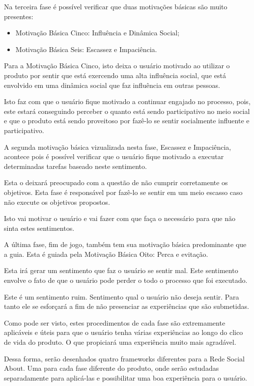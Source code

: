 Na terceira fase é possível verificar que duas motivações básicas são muito presentes:

\begin{itemize}
    \item Motivação Básica Cinco: Influência e Dinâmica Social;
    \item Motivação Básica Seis: Escassez e Impaciência.
\end{itemize}


Para a Motivação Básica Cinco, isto deixa o usuário motivado ao utilizar o produto
por sentir que está exercendo uma alta influência social, que está envolvido em
uma dinâmica social que faz influência em outras pessoas.

Isto faz com que o usuário fique motivado a continuar engajado no processo, pois,
este estará conseguindo perceber o quanto está sendo participativo no meio social
e que o produto está sendo proveitoso por fazê-lo se sentir socialmente influente
e participativo.


A segunda motivação básica vizualizada nesta fase, Escassez e Impaciência, acontece
pois é possível verificar que o usuário fique motivado a executar determinadas
tarefas baseado neste sentimento.

Esta o deixará preocupado com a questão de não cumprir corretamente os objetivos.
Esta fase é responsável por fazê-lo se sentir em um meio escasso caso não execute
os objetivos propostos.

Isto vai motivar o usuário e vai fazer com que faça o necessário para que não
sinta estes sentimentos.

A última fase, fim de jogo, também tem sua motivação básica predominante que
a guia. Esta é guiada pela Motivação Básica Oito: Perca e evitação.

Esta irá gerar um sentimento que faz o usuário se sentir mal. Este sentimento
envolve o fato de que o usuário pode perder o todo o processo que foi executado.


Este é um sentimento ruim. Sentimento qual o usuário não deseja sentir. Para tanto
ele se esforçará a fim de não presenciar as experiências que são submetidas.

Como pode ser visto, estes procedimentos de cada fase são extremamente aplicáveis
e úteis para que o usuário tenha várias experiências ao longo do clico de vida do
produto. O que propiciará uma experiência muito mais agradável.

Dessa forma, serão desenhados quatro frameworks diferentes para a Rede Social About.
Uma para cada fase diferente do produto, onde serão estudadas separadamente para
aplicá-las e possibilitar uma boa experiência para o usuário.

